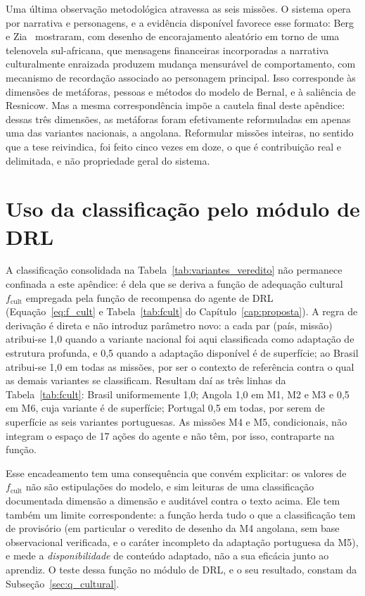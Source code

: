 \noindent Uma última observação metodológica atravessa as seis missões. O sistema opera por narrativa e personagens, e a evidência disponível favorece esse formato: Berg e Zia~\cite{berg2017} mostraram, com desenho de encorajamento aleatório em torno de uma telenovela sul-africana, que mensagens financeiras incorporadas a narrativa culturalmente enraizada produzem mudança mensurável de comportamento, com mecanismo de recordação associado ao personagem principal. Isso corresponde às dimensões de metáforas, pessoas e métodos do modelo de Bernal, e à saliência de Resnicow. Mas a mesma correspondência impõe a cautela final deste apêndice: dessas três dimensões, as metáforas foram efetivamente reformuladas em apenas uma das variantes nacionais, a angolana. Reformular missões inteiras, no sentido que a tese reivindica, foi feito cinco vezes em doze, o que é contribuição real e delimitada, e não propriedade geral do sistema.

\section*{Uso da classificação pelo módulo de DRL}
\label{sec:variantes_fcult}

A classificação consolidada na Tabela~\ref{tab:variantes_veredito} não permanece confinada a este apêndice: é dela que se deriva a função de adequação cultural $f_{\text{cult}}$ empregada pela função de recompensa do agente de DRL (Equação~\ref{eq:f_cult} e Tabela~\ref{tab:fcult} do Capítulo~\ref{cap:proposta}). A regra de derivação é direta e não introduz parâmetro novo: a cada par (país, missão) atribui-se 1,0 quando a variante nacional foi aqui classificada como adaptação de estrutura profunda, e 0,5 quando a adaptação disponível é de superfície; ao Brasil atribui-se 1,0 em todas as missões, por ser o contexto de referência contra o qual as demais variantes se classificam. Resultam daí as três linhas da Tabela~\ref{tab:fcult}: Brasil uniformemente 1,0; Angola 1,0 em M1, M2 e M3 e 0,5 em M6, cuja variante é de superfície; Portugal 0,5 em todas, por serem de superfície as seis variantes portuguesas. As missões M4 e M5, condicionais, não integram o espaço de 17 ações do agente e não têm, por isso, contraparte na função.

Esse encadeamento tem uma consequência que convém explicitar: os valores de $f_{\text{cult}}$ não são estipulações do modelo, e sim leituras de uma classificação documentada dimensão a dimensão e auditável contra o texto acima. Ele tem também um limite correspondente: a função herda tudo o que a classificação tem de provisório (em particular o veredito de desenho da M4 angolana, sem base observacional verificada, e o caráter incompleto da adaptação portuguesa da M5), e mede a \emph{disponibilidade} de conteúdo adaptado, não a sua eficácia junto ao aprendiz. O teste dessa função no módulo de DRL, e o seu resultado, constam da Subseção~\ref{sec:q_cultural}.




